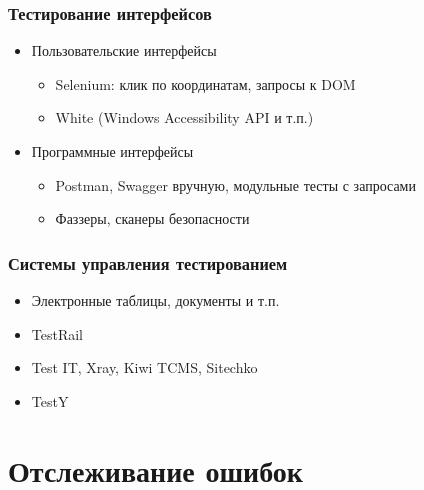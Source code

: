 \documentclass{../../slides-style}
\begin{document}
    \begin{frame}
        \frametitle{Тестирование интерфейсов}
        \begin{itemize}
            \item Пользовательские интерфейсы
            \begin{itemize}
                \item Selenium: клик по координатам, запросы к DOM
                \item White (Windows Accessibility API и т.п.)
            \end{itemize}
            \item Программные интерфейсы
            \begin{itemize}
                \item Postman, Swagger вручную, модульные тесты с запросами
                \item Фаззеры, сканеры безопасности
            \end{itemize}
        \end{itemize}
    \end{frame}

    \begin{frame}
        \frametitle{Системы управления тестированием}
        \begin{itemize}
            \item Электронные таблицы, документы и т.п.
            \item TestRail
            \item Test IT, Xray, Kiwi TCMS, Sitechko
            \item TestY
        \end{itemize}
    \end{frame}

    \section{Отслеживание ошибок}
\end{document}
